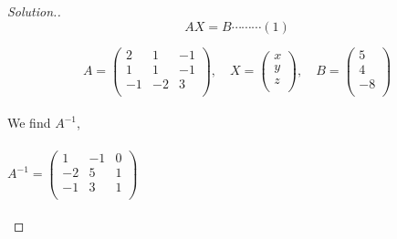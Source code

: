 \documentclass[11pt,a4paper]{article}
\theoremstyle{definition}
\newenvironment{solution}
  {\renewcommand{\qedsymbol}{}\begin{proof}[\textit{Solution}.]}
  {\end{proof}}
\begin{document}
\begin{enumerate}
\begin{solution}
$$AX=B\cdots \cdots \cdots (1)$$

$$A=
\begin{pmatrix}
2 & 1 & -1\\
1 & 1 & -1\\
-1 & -2 & 3\\
\end{pmatrix}
,\quad 
X=
\begin{pmatrix}
x\\y\\z\\
\end{pmatrix}
,\quad 
B=
\begin{pmatrix}
5\\ 4 \\ -8\\
\end{pmatrix}
$$\\

We find $A^{-1}$,\\\\
$A^{-1}=
\begin{pmatrix}
1 & -1 & 0\\
-2 & 5 & 1\\
-1 & 3 & 1\\
\end{pmatrix}
$\\\\


\end{solution}
\end{enumerate}
\end{document}
